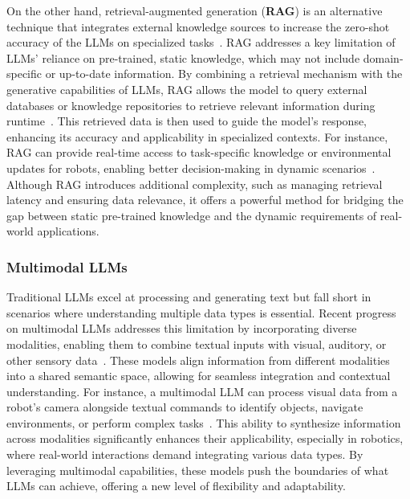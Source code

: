 On the other hand, retrieval-augmented generation (\textbf{RAG}) is an alternative technique that integrates external knowledge sources to increase the zero-shot accuracy of the LLMs on specialized tasks~\cite{lewis2020retrieval, huang2023survey}. RAG addresses a key limitation of LLMs' reliance on pre-trained, static knowledge, which may not include domain-specific or up-to-date information. By combining a retrieval mechanism with the generative capabilities of LLMs, RAG allows the model to query external databases or knowledge repositories to retrieve relevant information during runtime~\cite{gao2023retrieval}. This retrieved data is then used to guide the model's response, enhancing its accuracy and applicability in specialized contexts. For instance, RAG can provide real-time access to task-specific knowledge or environmental updates for robots, enabling better decision-making in dynamic scenarios~\cite{zhu2024retrieval}. Although RAG introduces additional complexity, such as managing retrieval latency and ensuring data relevance, it offers a powerful method for bridging the gap between static pre-trained knowledge and the dynamic requirements of real-world applications.


\subsubsection{Multimodal LLMs}
Traditional LLMs excel at processing and generating text but fall short in scenarios where understanding multiple data types is essential. Recent progress on multimodal LLMs addresses this limitation by incorporating diverse modalities, enabling them to combine textual inputs with visual, auditory, or other sensory data~\cite{yin2023survey}. These models align information from different modalities into a shared semantic space, allowing for seamless integration and contextual understanding. For instance, a multimodal LLM can process visual data from a robot's camera alongside textual commands to identify objects, navigate environments, or perform complex tasks~\cite{kim_survey_2024, wang2024large_survey}. This ability to synthesize information across modalities significantly enhances their applicability, especially in robotics, where real-world interactions demand integrating various data types. By leveraging multimodal capabilities, these models push the boundaries of what LLMs can achieve, offering a new level of flexibility and adaptability.

